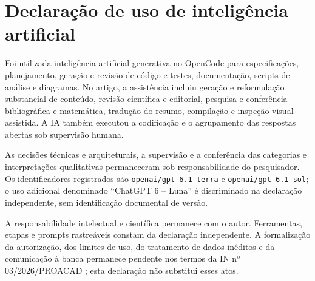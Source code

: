 \section*{Declaração de uso de inteligência artificial}

Foi utilizada inteligência artificial generativa no OpenCode para especificações, planejamento, geração e revisão de código e testes, documentação, scripts de análise e diagramas. No artigo, a assistência incluiu geração e reformulação substancial de conteúdo, revisão científica e editorial, pesquisa e conferência bibliográfica e matemática, tradução do resumo, compilação e inspeção visual assistida. A IA também executou a codificação e o agrupamento das respostas abertas sob supervisão humana.

As decisões técnicas e arquiteturais, a supervisão e a conferência das categorias e interpretações qualitativas permaneceram sob responsabilidade do pesquisador. Os identificadores registrados são \texttt{openai/gpt-6.1-terra} e \texttt{openai/gpt-6.1-sol}; o uso adicional denominado ``ChatGPT 6 -- Luna'' é discriminado na declaração independente, sem identificação documental de versão.

A responsabilidade intelectual e científica permanece com o autor. Ferramentas, etapas e prompts rastreáveis constam da declaração independente. A formalização da autorização, dos limites de uso, do tratamento de dados inéditos e da comunicação à banca permanece pendente nos termos da IN nº 03/2026/PROACAD \citep{UPF_IA2026}; esta declaração não substitui esses atos.
